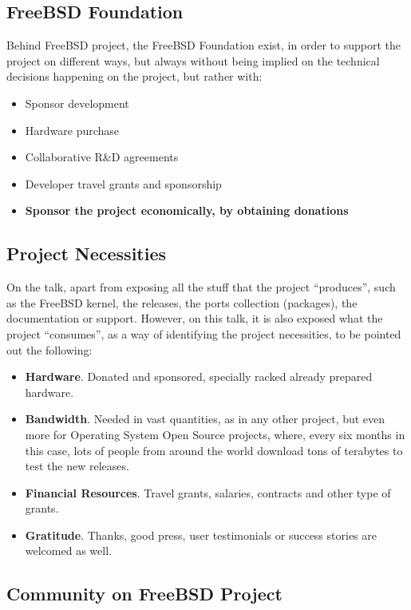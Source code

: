 \documentclass[11pt]{article}
\begin{document}
\subsection{FreeBSD Foundation}
Behind FreeBSD project, the FreeBSD Foundation exist, in order to support the project on different ways, but always without being implied on the technical decisions happening on the project, but rather with:
\begin{itemize}\itemsep0pt
\item{Sponsor development}
\item{Hardware purchase}
\item{Collaborative R\&D agreements}
\item{Developer travel grants and sponsorship}
\item{\textbf{Sponsor the project economically, by obtaining donations}}
\end{itemize}
\subsection{Project Necessities}
On the talk, apart from exposing all the stuff that the project ``produces'', such as the FreeBSD kernel, the releases, the ports collection (packages), the documentation or support. However, on this talk, it is also exposed what the project ``consumes'', as a way of identifying the project necessities, to be pointed out the following:
\begin{itemize}\itemsep0pt
\item{\textbf{Hardware}}. Donated and sponsored, specially racked already prepared hardware.
\item{\textbf{Bandwidth}}. Needed in vast quantities, as in any other project, but even more for Operating System Open Source projects, where, every six months in this case, lots of people from around the world download tons of terabytes to test the new releases.
\item{\textbf{Financial Resources}}. Travel grants, salaries, contracts and other type of grants.
\item{\textbf{Gratitude}}. Thanks, good press, user testimonials or success stories are welcomed as well.
\end{itemize}
\subsection{Community on FreeBSD Project}
\end{document}
